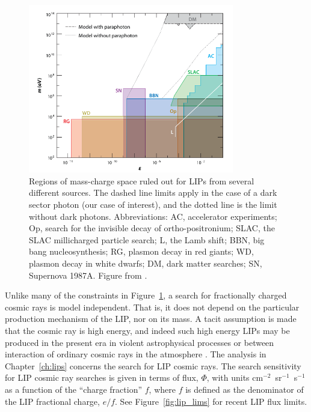 \begin{figure}[htbp]
\begin{center}
\includegraphics[width=0.8\textwidth]{figures/theory/lip_constraints.png}
\caption{Regions of mass-charge space ruled out for \acs{LIP}s from several different sources. The dashed line limits apply in the case of a dark sector photon (our case of interest), and the dotted line is the limit without dark photons. Abbreviations: AC, accelerator experiments; Op, search for the invisible decay of ortho-positronium; SLAC, the SLAC millicharged particle search; L, the Lamb shift; BBN, big bang nucleosynthesis; RG, plasmon decay in red giants; WD, plasmon decay in white dwarfs; DM, dark matter searches; SN, Supernova 1987A.  Figure from \cite{Perl2009}. }
\label{fig:lip_constraints}
\end{center}
\end{figure}

Unlike many of the constraints in Figure~\ref{fig:lip_constraints}, a search for fractionally charged cosmic rays is model independent. That is, it does not depend on the particular production mechanism of the \ac{LIP}, nor on its mass. A tacit assumption is made that the cosmic ray is high energy, and indeed such high energy \ac{LIP}s may be produced in the present era in violent astrophysical processes or between interaction of ordinary cosmic rays in the atmosphere \cite{Perl2009}. The analysis in Chapter~\ref{ch:lips} concerns the search for \ac{LIP} cosmic rays. The search sensitivity for \ac{LIP} cosmic ray searches is given in terms of flux, $\Phi$, with units cm$^{-2}$~sr$^{-1}$~s$^{-1}$ as a function of the ``charge fraction'' $f$, where $f$ is defined as the denominator of the \ac{LIP} fractional charge, $e/f$. See Figure~\ref{fig:lip_lims} for recent \ac{LIP} flux limits. 

